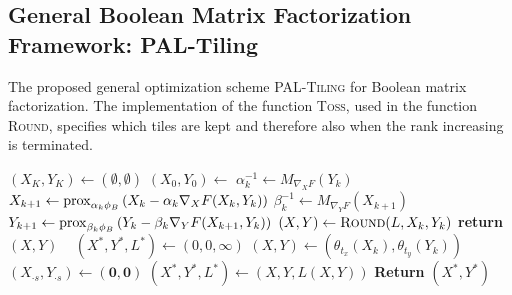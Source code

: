 \subsection{General Boolean Matrix Factorization Framework:  PAL-Tiling }\label{sec:PT:vanillaAlg}
\begin{algorithm}[t]
\caption{The proposed general optimization scheme \textsc{PAL-Tiling} for Boolean matrix factorization. The implementation of the function \textsc{Toss}, used in the function \textsc{Round}, specifies which tiles are kept and therefore also when the rank increasing is terminated.}
\begin{algorithmic}[1]
    \State $(X_K,Y_K)\gets (\emptyset, \emptyset)$
    \State $(X_0,Y_0) \gets $  \label{alg:paltiling:increaseRank}
    \label{alg:paltiling:opt} 
    	\State $\alpha_k^{-1} \gets M_{\nabla_XF}(Y_k)$
        \State $X_{k+1} \gets \operatorname{prox}_{\alpha_k\phi_B}\left(X_k-\alpha_k\nabla_XF(X_k,Y_k)\right)$
       	\State $\beta_k^{-1} \gets M_{\nabla_YF}(X_{k+1})$
        \State $Y_{k+1} \gets \operatorname{prox}_{\beta_k\phi_B}\left(Y_k-\beta_k\nabla_YF(X_{k+1},Y_k)\right)$
    \EndFor
    \State $(X,Y)\gets \Call{Round}{L,X_k,Y_k}$  \label{alg:paltiling:round}
    	\textbf{return} $(X,Y)$
    \EndIIf \label{alg:paltiling:rankGap}
    \EndFor
  \EndFunction
  \Statex ~
  \State $(X^*,Y^*,L^*)\gets (0,0,\infty)$
    \State $(X,Y)\gets (\theta_{t_x}(X_k),\theta_{t_y}(Y_k))$
         $(X_{\cdot s},Y_{\cdot s})\gets (\mathbf{0},\mathbf{0})$ \label{alg:paltiling:toss}
        \EndIIf
    \EndFor
     $(X^*,Y^*,L^*)\gets (X,Y,L(X,Y))$
    \EndIIf
  \EndFor
  \State \textbf{Return} $(X^*,Y^*)$
  \EndFunction
\end{algorithmic}
\label{alg:paltiling}
\end{algorithm}
